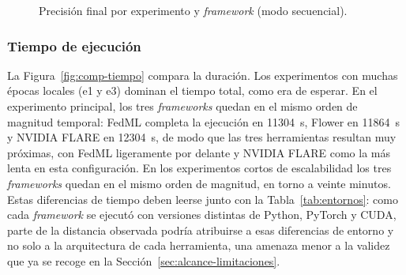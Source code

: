 \begin{figure}[htbp]
  \centering
  \caption{Precisión final por experimento y \textit{framework} (modo secuencial).}
  \label{fig:comp-acc}
\end{figure}

\subsubsection{Tiempo de ejecución}\label{sec:comp-tiempo}

La Figura~\ref{fig:comp-tiempo} compara la duración. Los experimentos con muchas épocas locales
(e1 y e3) dominan el tiempo total, como era de esperar. En el experimento principal, los tres
\textit{frameworks} quedan en el mismo orden de magnitud temporal: FedML completa la
ejecución en 11304~s, Flower en 11864~s y NVIDIA FLARE en 12304~s, de modo que las tres
herramientas resultan muy próximas, con FedML ligeramente por delante y NVIDIA FLARE como la más
lenta en esta configuración. En los experimentos cortos de
escalabilidad los tres \textit{frameworks} quedan en el mismo orden de magnitud, en torno a
veinte minutos. Estas diferencias de tiempo deben leerse junto con la
Tabla~\ref{tab:entornos}: como cada \textit{framework} se ejecutó con versiones
distintas de Python, PyTorch y CUDA, parte de la distancia observada podría atribuirse a esas
diferencias de entorno y no solo a la arquitectura de cada herramienta, una amenaza menor a la
validez que ya se recoge en la Sección~\ref{sec:alcance-limitaciones}.

